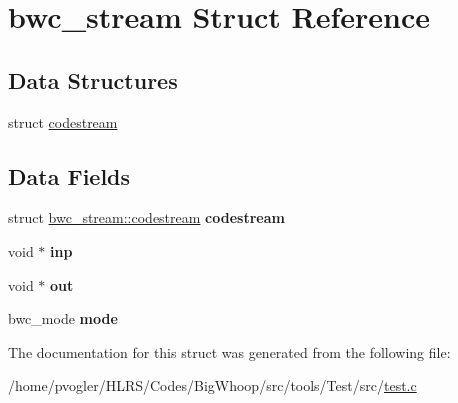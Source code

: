 \hypertarget{structbwc__stream}{}\section{bwc\+\_\+stream Struct Reference}
\label{structbwc__stream}
\subsection*{Data Structures}
\begin{DoxyCompactItemize}
\item 
struct \mbox{\hyperlink{structbwc__stream_1_1codestream}{codestream}}
\end{DoxyCompactItemize}
\subsection*{Data Fields}
\begin{DoxyCompactItemize}
\item 
\mbox{\label{structbwc__stream_a9f8325c4ff8969de3a6784168666125a}} 
struct \mbox{\hyperlink{structbwc__stream_1_1codestream}{bwc\+\_\+stream\+::codestream}} {\bfseries codestream}
\item 
\mbox{\label{structbwc__stream_a135a0bba197a5f83bd8795babf8095c8}} 
void $\ast$ {\bfseries inp}
\item 
\mbox{\label{structbwc__stream_a3130a0420739b9c49d87332d41c024d0}} 
void $\ast$ {\bfseries out}
\item 
\mbox{\label{structbwc__stream_a58a5476d1cf66d21e0634e4363026e78}} 
bwc\+\_\+mode {\bfseries mode}
\end{DoxyCompactItemize}


The documentation for this struct was generated from the following file\+:\begin{DoxyCompactItemize}
\item 
/home/pvogler/\+H\+L\+R\+S/\+Codes/\+Big\+Whoop/src/tools/\+Test/src/\mbox{\hyperlink{test_8c}{test.\+c}}\end{DoxyCompactItemize}

